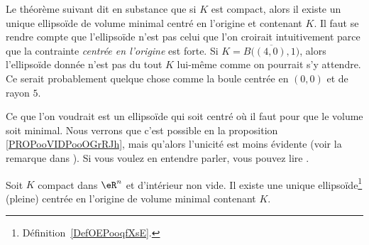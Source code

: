 \begin{normaltext}
	Le théorème suivant dit en substance que si \( K\) est compact, alors il existe un unique ellipsoïde de volume minimal centré en l'origine et contenant \( K\). Il faut se rendre compte que l'ellipsoïde n'est pas celui que l'on croirait intuitivement parce que la contrainte \emph{centrée en l'origine} est forte. Si \( K=\overline{ B\big( (4,0), 1 \big) }\), alors l'ellipsoïde donnée n'est pas du tout \( K\) lui-même comme on pourrait s'y attendre. Ce serait probablement quelque chose comme la boule centrée en \( (0,0)\) et de rayon \( 5\).

	Ce que l'on voudrait est un ellipsoïde qui soit centré où il faut pour que le volume soit minimal. Nous verrons que c'est possible en la proposition \ref{PROPooVIDPooOGrRJh}, mais qu'alors l'unicité est moins évidente (voir la remarque dans \cite{ooJWHFooGQQhUW}). Si vous voulez en entendre parler, vous pouvez lire \cite{ooASOAooNwZFKS,ooWLGRooFScSaM}.
\end{normaltext}

\begin{proposition}   \label{PropJYVooRMaPok}
	Soit \( K\) compact dans \( \eR^n\) et d'intérieur non vide. Il existe une unique ellipsoïde\footnote{Définition~\ref{DefOEPooqfXsE}.} (pleine) centrée en l'origine de volume minimal contenant \( K\).
\end{proposition}

